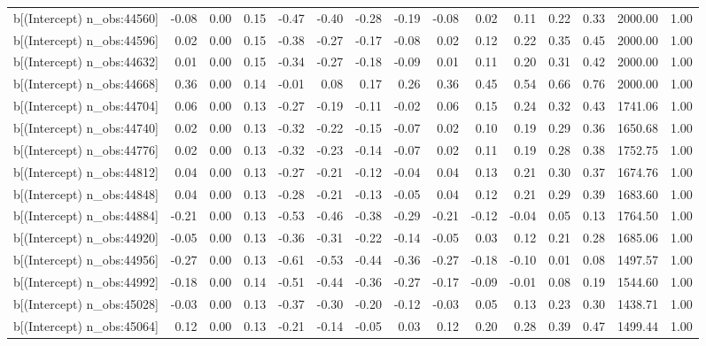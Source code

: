 \begin{table}[ht]
\begin{tabular}{rrrrrrrrrrrrrrr}
  b[(Intercept) n\_obs:44560] & -0.08 & 0.00 & 0.15 & -0.47 & -0.40 & -0.28 & -0.19 & -0.08 & 0.02 & 0.11 & 0.22 & 0.33 & 2000.00 & 1.00 \\ 
  b[(Intercept) n\_obs:44596] & 0.02 & 0.00 & 0.15 & -0.38 & -0.27 & -0.17 & -0.08 & 0.02 & 0.12 & 0.22 & 0.35 & 0.45 & 2000.00 & 1.00 \\ 
  b[(Intercept) n\_obs:44632] & 0.01 & 0.00 & 0.15 & -0.34 & -0.27 & -0.18 & -0.09 & 0.01 & 0.11 & 0.20 & 0.31 & 0.42 & 2000.00 & 1.00 \\ 
  b[(Intercept) n\_obs:44668] & 0.36 & 0.00 & 0.14 & -0.01 & 0.08 & 0.17 & 0.26 & 0.36 & 0.45 & 0.54 & 0.66 & 0.76 & 2000.00 & 1.00 \\ 
  b[(Intercept) n\_obs:44704] & 0.06 & 0.00 & 0.13 & -0.27 & -0.19 & -0.11 & -0.02 & 0.06 & 0.15 & 0.24 & 0.32 & 0.43 & 1741.06 & 1.00 \\ 
  b[(Intercept) n\_obs:44740] & 0.02 & 0.00 & 0.13 & -0.32 & -0.22 & -0.15 & -0.07 & 0.02 & 0.10 & 0.19 & 0.29 & 0.36 & 1650.68 & 1.00 \\ 
  b[(Intercept) n\_obs:44776] & 0.02 & 0.00 & 0.13 & -0.32 & -0.23 & -0.14 & -0.07 & 0.02 & 0.11 & 0.19 & 0.28 & 0.38 & 1752.75 & 1.00 \\ 
  b[(Intercept) n\_obs:44812] & 0.04 & 0.00 & 0.13 & -0.27 & -0.21 & -0.12 & -0.04 & 0.04 & 0.13 & 0.21 & 0.30 & 0.37 & 1674.76 & 1.00 \\ 
  b[(Intercept) n\_obs:44848] & 0.04 & 0.00 & 0.13 & -0.28 & -0.21 & -0.13 & -0.05 & 0.04 & 0.12 & 0.21 & 0.29 & 0.39 & 1683.60 & 1.00 \\ 
  b[(Intercept) n\_obs:44884] & -0.21 & 0.00 & 0.13 & -0.53 & -0.46 & -0.38 & -0.29 & -0.21 & -0.12 & -0.04 & 0.05 & 0.13 & 1764.50 & 1.00 \\ 
  b[(Intercept) n\_obs:44920] & -0.05 & 0.00 & 0.13 & -0.36 & -0.31 & -0.22 & -0.14 & -0.05 & 0.03 & 0.12 & 0.21 & 0.28 & 1685.06 & 1.00 \\ 
  b[(Intercept) n\_obs:44956] & -0.27 & 0.00 & 0.13 & -0.61 & -0.53 & -0.44 & -0.36 & -0.27 & -0.18 & -0.10 & 0.01 & 0.08 & 1497.57 & 1.00 \\ 
  b[(Intercept) n\_obs:44992] & -0.18 & 0.00 & 0.14 & -0.51 & -0.44 & -0.36 & -0.27 & -0.17 & -0.09 & -0.01 & 0.08 & 0.19 & 1544.60 & 1.00 \\ 
  b[(Intercept) n\_obs:45028] & -0.03 & 0.00 & 0.13 & -0.37 & -0.30 & -0.20 & -0.12 & -0.03 & 0.05 & 0.13 & 0.23 & 0.30 & 1438.71 & 1.00 \\ 
  b[(Intercept) n\_obs:45064] & 0.12 & 0.00 & 0.13 & -0.21 & -0.14 & -0.05 & 0.03 & 0.12 & 0.20 & 0.28 & 0.39 & 0.47 & 1499.44 & 1.00 \\ 

\end{tabular}
\end{table}
